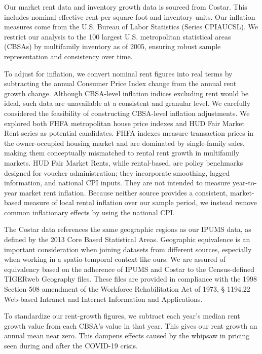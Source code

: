 \documentclass[pdflatex,sn-basic]{sn-jnl}%
\theoremstyle{thmstyleone}%
\theoremstyle{thmstyletwo}%
\theoremstyle{thmstylethree}%
\begin{document}
Our market rent data and inventory growth data is sourced from Costar. This includes nominal effective rent per square foot and inventory units. Our inflation measures come from the U.S. Bureau of Labor Statistics (Series CPIAUCSL). We restrict our analysis to the 100 largest U.S. metropolitan statistical areas (CBSAs) by multifamily inventory as of 2005, ensuring robust sample representation and consistency over time.

To adjust for inflation, we convert nominal rent figures into real terms by subtracting the annual Consumer Price Index change from the annual rent growth change. Although CBSA-level inflation indices excluding rent would be ideal, such data are unavailable at a consistent and granular level. We carefully considered the feasibility of constructing CBSA-level inflation adjustments. We explored both FHFA metropolitan house price indexes and HUD Fair Market Rent series as potential candidates. FHFA indexes measure transaction prices in the owner-occupied housing market and are dominated by single-family sales, making them conceptually mismatched to rental rent growth in multifamily markets. HUD Fair Market Rents, while rental-based, are policy benchmarks designed for voucher administration; they incorporate smoothing, lagged information, and national CPI inputs. They are not intended to measure year-to-year market rent inflation. Because neither source provides a consistent, market-based measure of local rental inflation over our sample period, we instead remove common inflationary effects by using the national CPI.

The Costar data references the same geographic regions as our IPUMS data, as defined by the 2013 Core Based Statistical Areas. Geographic equivalence is an important consideration when joining datasets from different sources, especially when working in a spatio-temporal context like ours. We are assured of equivalency based on the adherence of IPUMS and Costar to the Census-defined TIGERweb Geography files. These files are provided in compliance with the 1998 Section 508 amendment of the Workforce Rehabilitation Act of 1973, § 1194.22 Web-based Intranet and Internet Information and Applications.

To standardize our rent-growth figures, we subtract each year's median rent growth value from each CBSA's value in that year. This gives our rent growth an annual mean near zero. This dampens effects caused by the whipsaw in pricing seen during and after the COVID-19 crisis.
\end{document}
